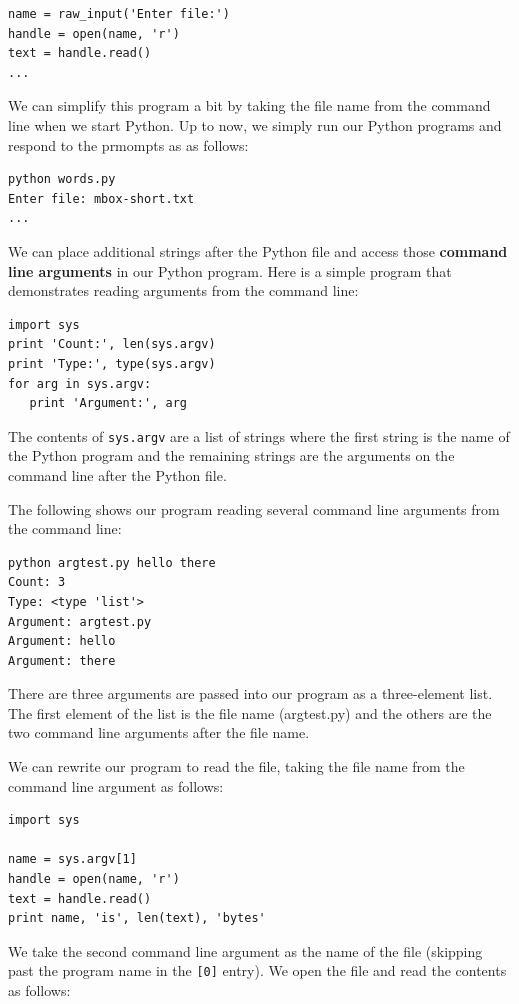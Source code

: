 \documentclass[10pt]{book}
\begin{document}
\beforeverb
\begin{verbatim}
name = raw_input('Enter file:')
handle = open(name, 'r')
text = handle.read()
...
\end{verbatim}
\afterverb
%
We can simplify this program a bit by taking the file name
from the command line when we start Python.  Up to now,
we simply run our Python programs and respond to the 
prmompts as as follows:

\beforeverb
\begin{verbatim}
python words.py
Enter file: mbox-short.txt
...
\end{verbatim}
\afterverb
%
We can place additional strings after the Python file and access
those {\bf command line arguments} in our Python program.  Here is a simple program 
that demonstrates reading arguments from the command line:

\beforeverb
\begin{verbatim}
import sys
print 'Count:', len(sys.argv)
print 'Type:', type(sys.argv)
for arg in sys.argv:
   print 'Argument:', arg
\end{verbatim}
\afterverb
%
The contents of {\tt sys.argv} are a list of strings where the first string
is the name of the Python program and the remaining strings are the arguments
on the command line after the Python file.

The following shows our program reading several command line arguments from the command
line:

\beforeverb
\begin{verbatim}
python argtest.py hello there
Count: 3
Type: <type 'list'>
Argument: argtest.py
Argument: hello
Argument: there
\end{verbatim}
\afterverb
%
There are three arguments are passed into our program as a three-element list.  
The first element of the list is the file name (argtest.py) and the others are 
the two command line arguments after the file name.

We can rewrite our program to read the file, taking the file name 
from the command line argument as follows:
\beforeverb
\begin{verbatim}
import sys

name = sys.argv[1]
handle = open(name, 'r')
text = handle.read()
print name, 'is', len(text), 'bytes'
\end{verbatim}
\afterverb
%
We take the second command line argument as the name of the file (skipping past
the program name in the {\tt [0]} entry).  We open the file and read 
the contents as follows:
\end{document}
